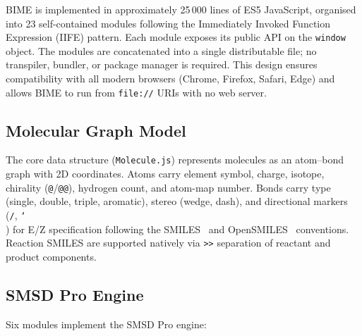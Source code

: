 \documentclass[twocolumn]{article}
\begin{document}
BIME is implemented in approximately 25\,000 lines of ES5 JavaScript,
organised into 23 self-contained modules following the Immediately
Invoked Function Expression (IIFE) pattern.  Each module exposes its
public API on the \texttt{window} object.  The modules are concatenated
into a single distributable file; no transpiler, bundler, or package
manager is required.  This design ensures compatibility with all modern
browsers (Chrome, Firefox, Safari, Edge) and allows BIME to run from
\texttt{file://} URIs with no web server.

\subsection{Molecular Graph Model}

The core data structure (\texttt{Molecule.js}) represents molecules as
an atom--bond graph with 2D coordinates.  Atoms carry element symbol,
charge, isotope, chirality (\texttt{@}/\texttt{@@}), hydrogen count, and
atom-map number.  Bonds carry type (single, double, triple, aromatic),
stereo (wedge, dash), and directional markers (\texttt{/},
\texttt{\char`\\}) for E/Z specification following the
SMILES~\citep{Weininger1988} and OpenSMILES~\citep{OpenSMILES2024}
conventions.  Reaction SMILES are supported
natively via \texttt{>>} separation of reactant and product components.

\subsection{SMSD Pro Engine}

Six modules implement the SMSD Pro engine:
\end{document}
